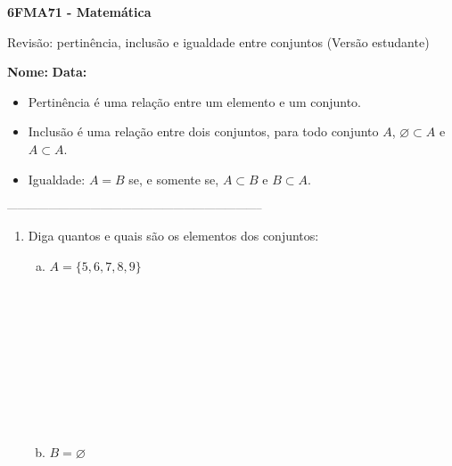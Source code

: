 \documentclass[a4paper,14pt]{article}
\begin{document}
	
	\noindent\textbf{6FMA71 - Matemática} 
	
	\begin{center}Revisão: pertinência, inclusão e igualdade entre conjuntos (Versão estudante)
	\end{center}
	
	\noindent\textbf{Nome:} \underline{\hspace{10cm}}
	\noindent\textbf{Data:} \underline{\hspace{4cm}}
	
	
	\begin{multicols}{2}
		\noindent 
		\begin{itemize}
			\item Pertinência é uma relação entre um elemento e um conjunto.
			\item Inclusão é uma relação entre dois conjuntos, para todo conjunto $A$, $\varnothing \subset A$ e $A \subset A$.
			\item Igualdade: $A = B$ se, e somente se, $A \subset B$ e $B \subset A$.
		\end{itemize}
		\noindent\textsubscript{--------------------------------------------------------------------------}
    	\begin{enumerate}
   			\item Diga quantos e quais são os elementos dos conjuntos:
   			\begin{enumerate}[a)]
   				\item $A = \{5, 6, 7, 8, 9\}$ \\\\\\\\\\\\\\\\\\\\
   				\item $B = \varnothing$ \\\\\\\\\\\\\\\\\\\\

\end{enumerate}
\end{enumerate}
\end{multicols}
\end{document}
